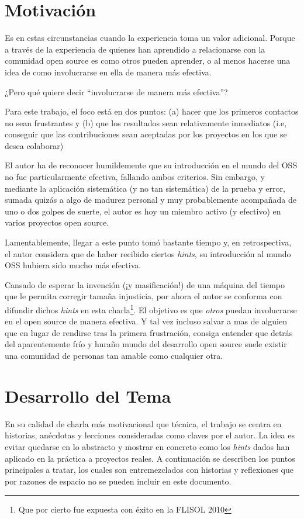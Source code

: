 \section*{Motivación}

Es en estas circunstancias cuando la experiencia toma un valor adicional. Porque
a través de la experiencia de quienes han aprendido a relacionarse con la
comunidad open source es como otros pueden aprender, o al menos hacerse una idea
de como involucrarse en ella de manera más efectiva.

¿Pero qué quiere decir ``involucrarse de manera más efectiva''?

Para este trabajo, el foco está en dos puntos: (a) hacer que los primeros
contactos no sean frustrantes y (b) que los resultados sean relativamente
inmediatos (i.e, conseguir que las contribuciones sean aceptadas por los
proyectos en los que se desea colaborar)

El autor ha de reconocer humildemente que su introducción en el mundo del OSS no
fue particularmente efectiva, fallando ambos criterios. Sin embargo, y mediante
la aplicación sistemática (y no tan sistemática) de la prueba y error, sumada
quizás a algo de madurez personal y muy probablemente acompañada de uno o dos
golpes de suerte, el autor es hoy un miembro activo (y efectivo) en varios
proyectos open source.

Lamentablemente, llegar a este punto tomó bastante tiempo y, en
retrospectiva, el autor considera que de haber recibido ciertos \emph{hints}, su
introducción al mundo OSS hubiera sido mucho más efectiva. 

Cansado de esperar la invención (¡y masificación!) de una máquina del tiempo que
le permita corregir tamaña injusticia, por ahora el autor se conforma con
difundir dichos \emph{hints} en esta charla\footnote{Que por cierto fue expuesta
  con éxito en la FLISOL 2010}. El objetivo es que \emph{otros} puedan
involucrarse en el open source de manera efectiva. Y tal vez incluso salvar a
mas de alguien que en lugar de rendirse tras la primera frustración, consiga
entender que detrás del aparentemente frío y huraño mundo del desarrollo open
source suele existir una comunidad de personas tan amable como cualquier otra.

\section*{Desarrollo del Tema}

En su calidad de charla más motivacional que técnica, el trabajo se centra en
historias, anécdotas y lecciones consideradas como claves por el autor. La idea
es evitar quedarse en lo abstracto y mostrar en concreto como los \emph{hints}
dados han aplicado en la práctica a proyectos reales. A continuación se
describen los puntos principales a tratar, los cuales son entremezclados con
historias y reflexiones que por razones de espacio no se pueden incluir en este
documento.

